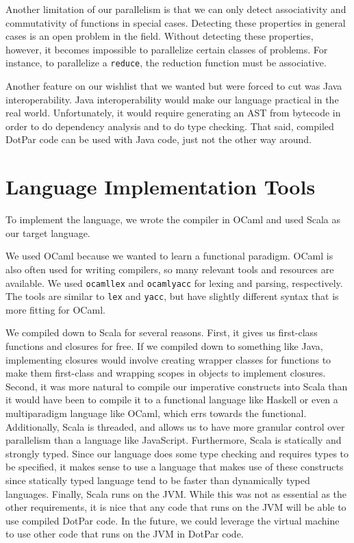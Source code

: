 Another limitation of our parallelism is that we can only detect associativity
and commutativity of functions in special cases. Detecting these properties in
general cases is an open problem in the field. Without detecting these
properties, however, it becomes impossible to parallelize certain classes of
problems. For instance, to parallelize a \verb$reduce$, the reduction function
must be associative.

Another feature on our wishlist that we wanted but were forced to cut was Java
interoperability. Java interoperability would make our language practical in the
real world. Unfortunately, it would require generating an AST from bytecode in
order to do dependency analysis and to do type checking. That said, compiled
DotPar code can be used with Java code, just not the other way around.

\section{Language Implementation Tools}
To implement the language, we wrote the compiler in OCaml and used Scala as our
target language.

We used OCaml because we wanted to learn a functional paradigm. OCaml is also
often used for writing compilers, so many relevant tools and resources are
available. We used \verb$ocamllex$ and \verb$ocamlyacc$ for lexing and parsing,
respectively. The tools are similar to \verb$lex$ and \verb$yacc$, but have
slightly different syntax that is more fitting for OCaml.

We compiled down to Scala for several reasons. First, it gives us first-class
functions and closures for free. If we compiled down to something like Java,
implementing closures would involve creating wrapper classes for functions to
make them first-class and wrapping scopes in objects to implement closures.
Second, it was more natural to compile our imperative constructs into Scala than
it would have been to compile it to a functional language like Haskell or even a
multiparadigm language like OCaml, which errs towards the functional.
Additionally, Scala is threaded, and allows us to have more granular control
over parallelism than a language like JavaScript. Furthermore, Scala is
statically and strongly typed. Since our language does some type checking and
requires types to be specified, it makes sense to use a language that makes use
of these constructs since statically typed language tend to be faster than
dynamically typed languages. Finally, Scala runs on the JVM\@. While this was not
as essential as the other requirements, it is nice that any code that runs on
the JVM will be able to use compiled DotPar code. In the future, we could
leverage the virtual machine to use other code that runs on the JVM in DotPar
code.

